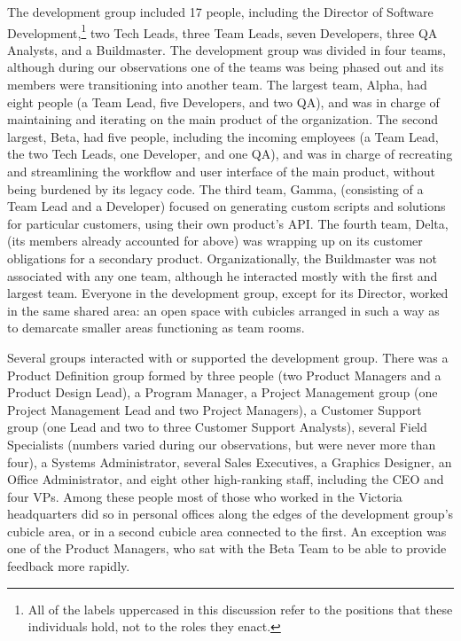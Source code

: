 \documentclass[10pt, conference, compsocconf]{IEEEtran}
\begin{document}
The development group included 17 people, including the Director of Software Development,\footnote{All of the labels uppercased in this discussion refer to the positions that these individuals hold, not to the roles they enact.} two Tech Leads, three Team Leads, seven Developers, three QA Analysts, and a Buildmaster. The development group was divided in four teams, although during our observations one of the teams was being phased out and its members were transitioning into another team. The largest team, Alpha, had eight people (a Team Lead, five Developers, and two QA), and was in charge of maintaining and iterating on the main product of the organization. The second largest, Beta, had five people, including the incoming employees (a Team Lead, the two Tech Leads, one Developer, and one QA), and was in charge of recreating and streamlining the workflow and user interface of the main product, without being burdened by its legacy code. The third team, Gamma, (consisting of a Team Lead and a Developer) focused on generating custom scripts and solutions for particular customers, using their own product's API. The fourth team, Delta, (its members already accounted for above) was wrapping up on its customer obligations for a secondary product. Organizationally, the Buildmaster was not associated with any one team, although he interacted mostly with the first and largest team. Everyone in the development group, except for its Director, worked in the same shared area: an open space with cubicles arranged in such a way as to demarcate smaller areas functioning as team rooms.

Several groups interacted with or supported the development group. There was a Product Definition group formed by three people (two Product Managers and a Product Design Lead), a Program Manager, a Project Management group (one Project Management Lead and two Project Managers), a Customer Support group (one Lead and two to three Customer Support Analysts), several Field Specialists (numbers varied during our observations, but were never more than four), a Systems Administrator, several Sales Executives, a Graphics Designer, an Office Administrator, and eight other high-ranking staff, including the CEO and four VPs. Among these people most of those who worked in the Victoria headquarters did so in personal offices along the edges of the development group's cubicle area, or in a second cubicle area connected to the first. An exception was one of the Product Managers, who sat with the Beta Team to be able to provide feedback more rapidly.
\end{document}
